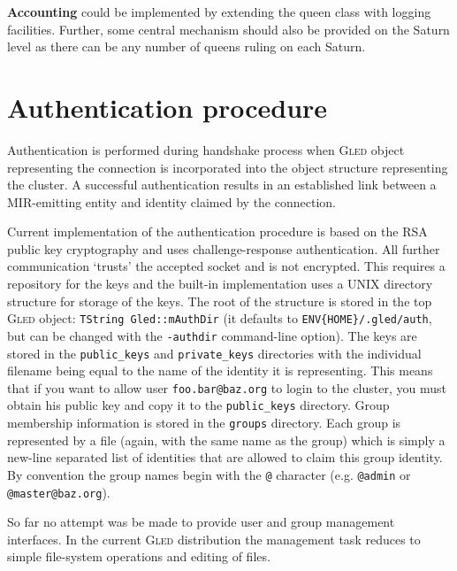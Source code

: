 \documentclass[a4paper,11pt]{article}
\def\gled{\textsc{Gled}\xspace}
\def\smalltt#1{{\small\texttt{#1}}}
\begin{document}
\textbf{Accounting} could be implemented by extending the queen class
with logging facilities. Further, some central mechanism should also
be provided on the Saturn level as there can be any number of queens 
ruling on each Saturn.


\section{Authentication procedure}
\label{sec:Authentication}

Authentication is performed during handshake process when \gled object
representing the connection is incorporated into the object structure
representing the cluster. A successful authentication results in an
established link between a MIR-emitting entity and identity claimed by
the connection.

Current implementation of the authentication procedure is based on the
RSA public key cryptography and uses challenge-response
authentication. All further communication `trusts' the accepted socket
and is not encrypted. This requires a repository for the keys and the
built-in implementation uses a UNIX directory structure for storage of
the keys. The root of the structure is stored in the top \gled object:
\smalltt{TString Gled::mAuthDir} (it defaults to
\smalltt{ENV\{HOME\}/\-.gled/\-auth}, but can be changed with the
\smalltt{-authdir} command-line option). The keys are stored in the
\smalltt{public\_keys} and \smalltt{private\_keys} directories with
the individual filename being equal to the name of the identity it is
representing. This means that if you want to allow user
\smalltt{foo.bar@baz.org} to login to the cluster, you must obtain his
public key and copy it to the \smalltt{public\_keys} directory.  Group
membership information is stored in the \smalltt{groups} directory.
Each group is represented by a file (again, with the same name as the
group) which is simply a new-line separated list of identities that
are allowed to claim this group identity. By convention the group
names begin with the \smalltt{@} character (e.g. \smalltt{@admin} or
\smalltt{@master@baz.org}).

So far no attempt was be made to provide user and group management
interfaces. In the current \gled distribution the management task
reduces to simple file-system operations and editing of files.
\end{document}
